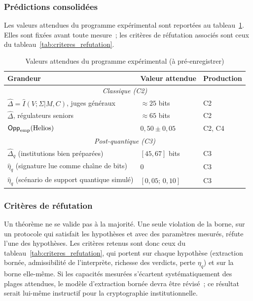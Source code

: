 \begin{sloppypar}
\subsubsection{Pr\'edictions consolid\'ees}
\label{subsubsec:predictions_consolidees}

Les valeurs attendues du programme exp\'erimental sont report\'ees au
tableau~\ref{tab:predictions_consolidees}. Elles sont fix\'ees avant toute
mesure~; les crit\`eres de r\'efutation associ\'es sont ceux du
tableau~\ref{tab:criteres_refutation}.

\begin{table}[htbp]
\centering
\caption{Valeurs attendues du programme exp\'erimental (\`a pr\'e-enregistrer)}
\label{tab:predictions_consolidees}
\small
\begin{tabular}{@{}p{5cm}p{3.5cm}p{2.5cm}@{}}
\toprule
\textbf{Grandeur} & \textbf{Valeur attendue} & \textbf{Production} \\
\midrule
\multicolumn{3}{c}{\textit{Classique (C2)}} \\
\midrule
$\hat\Delta = \hat I(V;\Sigma|M,C)$, juges g\'en\'eraux & $\approx 25$ bits & C2 \\
$\hat\Delta$, r\'egulateurs seniors & $\approx 65$ bits & C2 \\
$\mathsf{Opp}_{\mathrm{emp}}(\text{Helios})$ & $0{,}50 \pm 0{,}05$ & C2, C4 \\
\midrule
\multicolumn{3}{c}{\textit{Post-quantique (C3)}} \\
\midrule
$\hat\Delta_q$ (institutions bien pr\'epar\'ees) & $[45, 67]$ bits & C3 \\
$\hat\eta_q$ (signature lue comme cha\^{\i}ne de bits) & $0$ & C3 \\
$\hat\eta_q$ (sc\'enario de support quantique simul\'e) & $[0{,}05;\,0{,}10]$ & C3 \\
\bottomrule
\end{tabular}
\end{table}

\subsubsection{Crit\`eres de r\'efutation}
\label{subsubsec:criteres_reussite}

Un th\'eor\`eme ne se \og valide\fg{} pas \`a la majorit\'e. Une seule violation
de la borne, sur un protocole qui satisfait les hypoth\`eses et avec des
param\`etres mesur\'es, r\'efute l'une des hypoth\`eses. Les crit\`eres retenus
sont donc ceux du tableau~\ref{tab:criteres_refutation}, qui portent sur
chaque hypoth\`ese (extraction born\'ee, admissibilit\'e de l'interpr\`ete,
richesse des verdicts, perte $\eta_q$) et sur la borne elle-m\^eme. 
Si les capacit\'es mesur\'ees s'\'ecartent syst\'ematiquement des plages
attendues, le mod\`ele d'extraction born\'ee devra \^etre r\'evis\'e~; ce
r\'esultat serait lui-m\^eme instructif pour la cryptographie institutionnelle.
\end{sloppypar}

